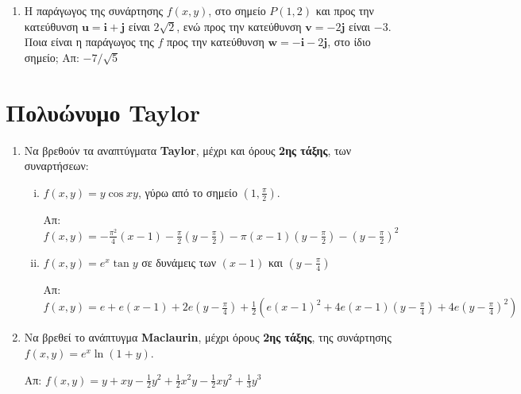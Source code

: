 \begin{enumerate}
  \item Η παράγωγος της συνάρτησης $ f(x,y) $, στο σημείο $ P(1,2) $ και προς την 
    κατεύθυνση $ \mathbf{u} = \mathbf{i} + \mathbf{j} $ είναι $ 2 \sqrt{2} $, ενώ 
    προς την κατεύθυνση $ \mathbf{v} = -2 \mathbf{j} $ είναι $ -3 $. Ποια είναι 
    η παράγωγος της $f$ προς την κατεύθυνση $ \mathbf{w} = - \mathbf{i}- 2\mathbf{j} $, 
    στο ίδιο σημείο; \hfill Απ: $ -7/ \sqrt{5} $
\end{enumerate}

\section*{Πολυώνυμο Taylor}

\begin{enumerate}
  \item Να βρεθούν τα αναπτύγματα \textbf{Taylor}, μέχρι και όρους 
    \textbf{2ης τάξης}, των συναρτήσεων:

    \begin{enumerate}[i)]
      \item  $f(x,y)=y\cos{xy} $, γύρω από το σημείο 
        $ \left(1, \frac{ \pi }{ 2 }\right) $.

        \hfill Απ: $f(x,y)=-\frac{\pi^{2}}{4}(x-1) - \frac{ \pi }{ 2 } 
        \left(y - \frac{ \pi }{2 }\right) - \pi(x-1)
        \left(y-\frac{\pi}{2}\right)- \left(y- \frac{ \pi }{ 2} \right)^{2} $

      \item $ f(x,y)=e^{x}\tan{y} $ σε δυνάμεις των $ (x-1) $ και 
        $ \left(y - \frac{ \pi }{ 4 }\right) $

        \hfill Απ: $ f(x,y) = e + e(x-1) + 2e\left(y- \frac{ \pi }{ 4 }\right)
        + \frac{1}{ 2 } \left(e(x-1)^{2}+4e(x-1)\left(y- \frac{ \pi }{ 4 }
        \right) + 4e\left(y- \frac{ \pi }{ 4 } \right)^{2}\right) $
    \end{enumerate}

  \item Να βρεθεί το ανάπτυγμα \textbf{Maclaurin}, μέχρι όρους \textbf{2ης
    τάξης}, της συνάρτησης $ f(x,y) = e^{x}\ln(1+y)$.

    \hfill Απ: $ f(x,y)=y + xy - \frac{1}{ 2 } y^{2} + \frac{1}{ 2 } x^{2}y - 
    \frac{1}{ 2 } xy^{2} + \frac{1}{ 3 } y^{3} $
\end{enumerate}





